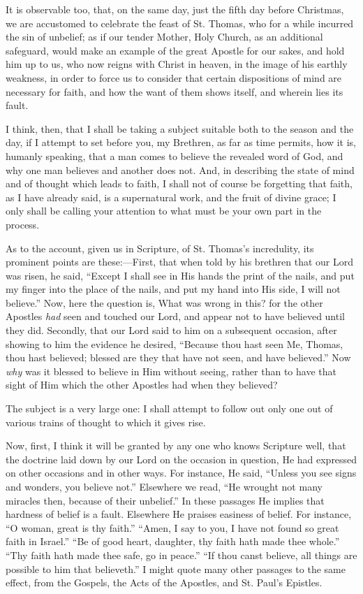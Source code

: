 It is observable too, that, on the same day, just the
fifth day before Christmas, we are accustomed to
celebrate the feast of St. Thomas, who for a while
incurred the sin of unbelief; as if our tender Mother,
Holy Church, as an additional safeguard, would make an
example of the great Apostle for our sakes, and hold him
up to us, who now reigns with Christ in heaven, in the
image of his earthly weakness, in order to force us to
consider that certain dispositions of mind are necessary
for faith, and how the want of them shows itself, and
wherein lies its fault.

I think, then, that I shall be taking a subject
suitable both to the season and the day, if I attempt to
set before you, my Brethren, as far as time permits, how
it is, humanly speaking, that a man comes to believe the
revealed word of God, and why one man believes and
another does not. And, in describing the state of mind
and of thought which leads to faith, I shall not of
course be forgetting that faith, as I have already said,
is a supernatural work, and the fruit of divine grace; I
only shall be calling your attention to what must be your
own part in the process.

As to the account, given us in Scripture, of St.
Thomas's incredulity, its prominent points are
these:—First, that when told by his brethren that
our Lord was risen, he said, ``Except I shall see in
His hands the print of the nails, and put my finger into
the place of the nails, and put my hand into His side, I
will not believe.'' Now, here the question is, What
was wrong in this? for the other Apostles \emph{had} seen and
touched our Lord, and appear not to have believed until
they did. Secondly, that our Lord said to him on a
subsequent occasion, after showing to him the evidence he
desired, ``Because thou hast seen Me, Thomas, thou
hast believed; blessed are they that have not seen, and
have believed.'' Now \emph{why} was it blessed to
believe in Him without seeing, rather than to have that
sight of Him which the other Apostles had when they
believed?

The subject is a very large one: I shall attempt to
follow out only one out of various trains of thought to
which it gives rise.

Now, first, I think it will be granted by any one who
knows Scripture well, that the doctrine laid down by our
Lord on the occasion in question, He had expressed on
other occasions and in other ways. For instance, He said,
``Unless you see signs and wonders, you believe
not.'' Elsewhere we read, ``He wrought not many
miracles then, because of their unbelief.'' In these
passages He implies that hardness of belief is a fault.
Elsewhere He praises easiness of belief. For instance,
``O woman, great is thy faith.'' ``Amen, I say to
you, I have not found so great faith in Israel.''
``Be of good heart, daughter, thy faith hath made
thee whole.'' ``Thy faith hath made thee safe, go
in peace.'' ``If thou canst believe, all things
are possible to him that believeth.'' I might quote
many other passages to the same effect, from the Gospels,
the Acts of the Apostles, and St. Paul's Epistles.

